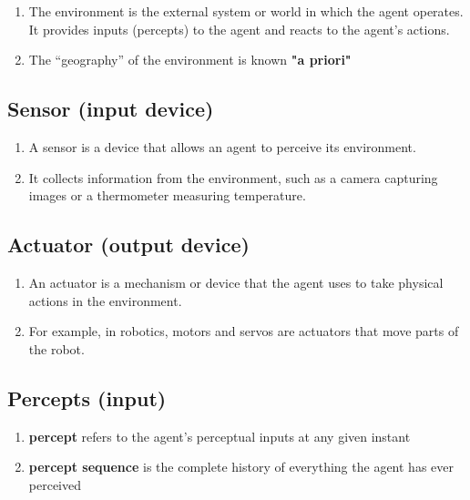 \begin{enumerate}
    \item The environment is the external system or world in which the agent operates. It provides inputs (percepts) to the agent and reacts to the agent's actions. \cite{chatgpt}

    \item The “geography” of the environment is known \textbf{"a priori"} 
\end{enumerate}


\subsection{Sensor (input device) \cite{chatgpt}}

\begin{enumerate}
    \item A sensor is a device that allows an agent to perceive its environment. 
    
    \item It collects information from the environment, such as a camera capturing images or a thermometer measuring temperature.
\end{enumerate}


\subsection{Actuator (output device) \cite{chatgpt}}

\begin{enumerate}
    \item An actuator is a mechanism or device that the agent uses to take physical actions in the environment. 
    
    \item For example, in robotics, motors and servos are actuators that move parts of the robot.
\end{enumerate}


\subsection{Percepts (input)}

\begin{enumerate}
    \item \textbf{percept} refers to the agent’s perceptual inputs at any given instant

    \item \textbf{percept sequence} is the complete history of everything the agent has ever perceived

\end{enumerate}


